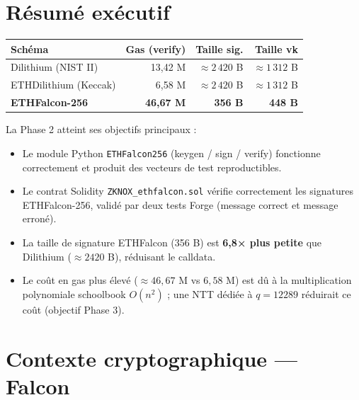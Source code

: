 \documentclass[11pt,a4paper]{article}
\begin{document}
\tableofcontents
\newpage

\section{Résumé exécutif}

\begin{resultbox}[title={Résultats de la Phase 2}]
\begin{center}
\begin{tabular}{lrrr}
\toprule
\textbf{Schéma} & \textbf{Gas (verify)} & \textbf{Taille sig.} & \textbf{Taille vk} \\
\midrule
Dilithium (NIST II) & 13{,}42 M & $\approx 2\,420$ B & $\approx 1\,312$ B \\
ETHDilithium (Keccak) & 6{,}58 M & $\approx 2\,420$ B & $\approx 1\,312$ B \\
\textbf{ETHFalcon-256} & \textbf{46{,}67 M} & \textbf{356 B} & \textbf{448 B} \\
\bottomrule
\end{tabular}
\end{center}
\end{resultbox}

\medskip

La Phase 2 atteint ses objectifs principaux :
\begin{itemize}
  \item Le module Python \texttt{ETHFalcon256} (keygen / sign / verify) fonctionne
        correctement et produit des vecteurs de test reproductibles.
  \item Le contrat Solidity \texttt{ZKNOX\_ethfalcon.sol} vérifie correctement les
        signatures ETHFalcon-256, validé par deux tests Forge (message correct et
        message erroné).
  \item La taille de signature ETHFalcon (356 B) est \textbf{6,8× plus petite}
        que Dilithium ($\approx 2420$ B), réduisant le calldata.
  \item Le coût en gas plus élevé ($\approx 46{,}67$ M vs $6{,}58$ M) est dû à la
        multiplication polynomiale schoolbook $O(n^2)$ ; une NTT dédiée à
        $q=12289$ réduirait ce coût (objectif Phase 3).
\end{itemize}

\section{Contexte cryptographique — Falcon}
\end{document}
